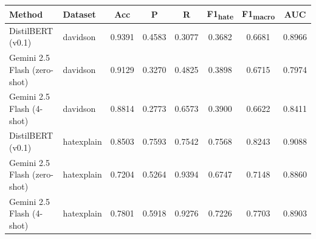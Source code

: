 \begin{tabular}{llcccccc}
\toprule
Method & Dataset & Acc & P & R & F1\textsubscript{hate} & F1\textsubscript{macro} & AUC \\
\midrule
DistilBERT (v0.1) & davidson & 0.9391 & 0.4583 & 0.3077 & 0.3682 & 0.6681 & 0.8966 \\
Gemini 2.5 Flash (zero-shot) & davidson & 0.9129 & 0.3270 & 0.4825 & 0.3898 & 0.6715 & 0.7974 \\
Gemini 2.5 Flash (4-shot) & davidson & 0.8814 & 0.2773 & 0.6573 & 0.3900 & 0.6622 & 0.8411 \\
DistilBERT (v0.1) & hatexplain & 0.8503 & 0.7593 & 0.7542 & 0.7568 & 0.8243 & 0.9088 \\
Gemini 2.5 Flash (zero-shot) & hatexplain & 0.7204 & 0.5264 & 0.9394 & 0.6747 & 0.7148 & 0.8860 \\
Gemini 2.5 Flash (4-shot) & hatexplain & 0.7801 & 0.5918 & 0.9276 & 0.7226 & 0.7703 & 0.8903 \\
\bottomrule
\end{tabular}
